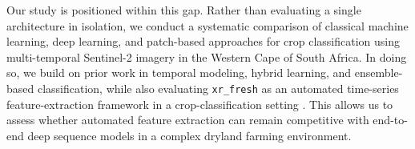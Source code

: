 \documentclass[pdflatex,sn-mathphys]{sn-jnl} %
\begin{document}
Our study is positioned within this gap. Rather than evaluating a single architecture in isolation, we conduct a systematic comparison of classical machine learning, deep learning, and patch-based approaches for crop classification using multi-temporal Sentinel-2 imagery in the Western Cape of South Africa. In doing so, we build on prior work in temporal modeling, hybrid learning, and ensemble-based classification, while also evaluating \texttt{xr\_fresh} as an automated time-series feature-extraction framework in a crop-classification setting \cite{mann2025}. This allows us to assess whether automated feature extraction can remain competitive with end-to-end deep sequence models in a complex dryland farming environment.





\end{document}
